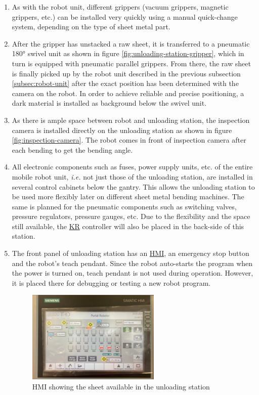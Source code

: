 \begin{enumerate}
    \item As with the robot unit, different grippers (vacuum grippers, magnetic grippers, etc.) can be
    installed very quickly using a manual quick-change system, depending on the type of sheet metal part.
    \item After the gripper has unstacked a raw sheet, it is transferred to a pneumatic 180° swivel unit as shown in figure \ref{fig:unloading-station-gripper}, which in
    turn is equipped with pneumatic parallel grippers. From
    there, the raw sheet is finally picked up by the robot unit described in the previous subsection \ref{subsec:robot-unit} after the
    exact position has been determined with the camera on the robot. In order to achieve reliable and
    precise positioning, a dark material is installed as background below the swivel unit. 
    \item As there is ample space between robot and unloading station, the inspection camera is installed directly on the unloading station as shown in figure \ref{fig:inspection-camera}.
    The robot comes in front of inspection camera after each bending to get the bending angle.
    \item All electronic
    components such as fuses, power supply units, etc. of the entire mobile robot unit, \textit{i.e.} not just those of
    the unloading station, are installed in several control cabinets below the gantry. This allows the
    unloading station to be used more flexibly later on different sheet metal bending machines. The same is
    planned for the pneumatic components such as switching valves, pressure regulators, pressure
    gauges, etc. Due to the flexibility and the space still available, the \hyperref[acro:KR]{KR} controller will also be
    placed in the back-side of this station.
    \item The front panel of unloading station has an \hyperref[acro:HMI]{HMI}, an emergency stop button and the robot's teach pendant. Since the robot auto-starts the program
    when the power is turned on, teach pendant is not used during operation. However, it is placed there for debugging or testing a new robot program.

    \begin{figure}[h]
        \centering
        \includegraphics[width=0.6\textwidth]{figures/simatic-hmi.jpeg}
        \caption{HMI showing the sheet available in the unloading station}
        \label{fig:simatic-hmi}
    \end{figure}


\end{enumerate}
